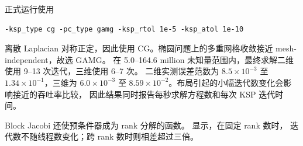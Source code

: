 \documentclass[11pt,a4paper,oneside]{report}
\begin{document}
正式运行使用
\begin{verbatim}
-ksp_type cg -pc_type gamg -ksp_rtol 1e-5 -ksp_atol 1e-10
\end{verbatim}
离散 Laplacian 对称正定，因此使用 CG。椭圆问题上的多重网格收敛接近 mesh-independent，故选 GAMG。
在 5.0--164.6 million 未知量范围内，最终求解二维使用 9--13 次迭代，三维使用 6--7 次。
二维实测误差范数为 $8.5\times10^{-3}$ 至 $1.34\times10^{-1}$，三维为
$6.0\times10^{-3}$ 至 $8.59\times10^{-2}$。布局引起的小幅迭代数变化会影响接近的吞吐率比较，
因此结果同时报告每秒求解方程数和每次 KSP 迭代时间。

Block Jacobi 还使预条件器成为 rank 分解的函数。 显示，在固定 rank 数时，
迭代数不随线程数变化；跨 rank 数时则相差超过三倍。
\end{document}
